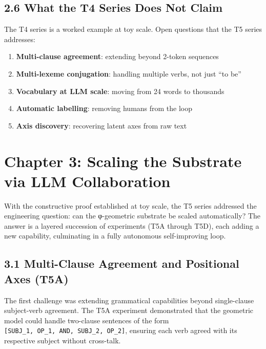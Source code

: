 \documentclass[
  twocolumn,
  10pt,
  a4paper]{article}
\providecommand{\tightlist}{%
  \setlength{\itemsep}{0pt}\setlength{\parskip}{0pt}}
\begin{document}
\hypertarget{what-the-t4-series-does-not-claim}{%
\subsection{2.6 What the T4 Series Does Not
Claim}\label{what-the-t4-series-does-not-claim}}

The T4 series is a worked example at toy scale. Open questions that the
T5 series addresses:

\begin{enumerate}
\def\labelenumi{\arabic{enumi}.}
\tightlist
\item
  \textbf{Multi-clause agreement}: extending beyond 2-token sequences
\item
  \textbf{Multi-lexeme conjugation}: handling multiple verbs, not just
  ``to be''
\item
  \textbf{Vocabulary at LLM scale}: moving from 24 words to thousands
\item
  \textbf{Automatic labelling}: removing humans from the loop
\item
  \textbf{Axis discovery}: recovering latent axes from raw text
\end{enumerate}

\hypertarget{chapter-3-scaling-the-substrate-via-llm-collaboration}{%
\FloatBarrier
\section{Chapter 3: Scaling the Substrate via LLM
Collaboration}\label{chapter-3-scaling-the-substrate-via-llm-collaboration}}

With the constructive proof established at toy scale, the T5 series
addressed the engineering question: can the φ-geometric substrate be
scaled automatically? The answer is a layered succession of experiments
(T5A through T5D), each adding a new capability, culminating in a fully
autonomous self-improving loop.

\hypertarget{multi-clause-agreement-and-positional-axes-t5a}{%
\subsection{3.1 Multi-Clause Agreement and Positional Axes
(T5A)}\label{multi-clause-agreement-and-positional-axes-t5a}}

The first challenge was extending grammatical capabilities beyond
single-clause subject-verb agreement. The T5A experiment demonstrated
that the geometric model could handle two-clause sentences of the form
\texttt{{[}SUBJ\_1,\ OP\_1,\ AND,\ SUBJ\_2,\ OP\_2{]}}, ensuring each
verb agreed with its respective subject without cross-talk.
\end{document}
